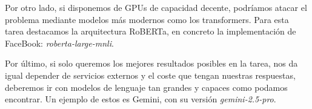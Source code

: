 \documentclass[11pt,spanish,listoffigures,listoftables]{tfgetsinf}
\begin{document}
Por otro lado, si disponemos de GPUs de capacidad decente, podríamos atacar el problema mediante modelos más modernos como los transformers. Para esta tarea destacamos la arquitectura RoBERTa, en concreto la implementación de FaceBook: \textit{roberta-large-mnli}. 

Por último, si solo queremos los mejores resultados posibles en la tarea, nos da igual depender de servicios externos y el coste que tengan nuestras respuestas, deberemos ir con modelos de lenguaje tan grandes y capaces como podamos encontrar. Un ejemplo de estos es Gemini, con su versión \textit{gemini-2.5-pro}. 

\cleardoublepage
\printbibliography





\end{document}

